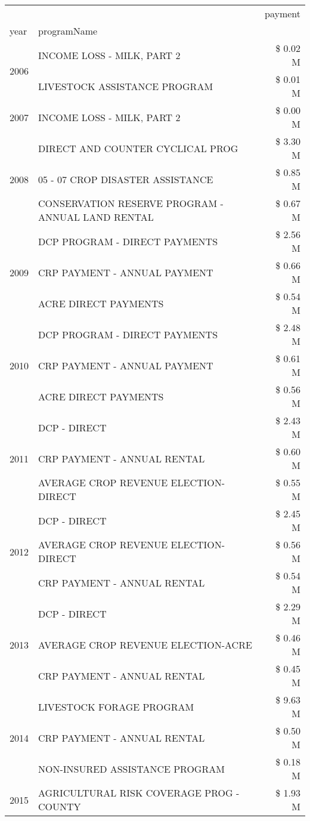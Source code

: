 \begin{tabular}{llr}
\toprule
 &  & payment \\
year & programName &  \\
\midrule
\multirow[t]{2}{*}{2006} & INCOME LOSS - MILK, PART 2 & \$ 0.02 M \\
 & LIVESTOCK ASSISTANCE PROGRAM & \$ 0.01 M \\
\cline{1-3}
2007 & INCOME LOSS - MILK, PART 2 & \$ 0.00 M \\
\cline{1-3}
\multirow[t]{3}{*}{2008} & DIRECT AND COUNTER CYCLICAL PROG & \$ 3.30 M \\
 & 05 - 07 CROP DISASTER ASSISTANCE & \$ 0.85 M \\
 & CONSERVATION RESERVE PROGRAM - ANNUAL LAND RENTAL & \$ 0.67 M \\
\cline{1-3}
\multirow[t]{3}{*}{2009} & DCP PROGRAM - DIRECT PAYMENTS & \$ 2.56 M \\
 & CRP PAYMENT - ANNUAL PAYMENT & \$ 0.66 M \\
 & ACRE DIRECT PAYMENTS & \$ 0.54 M \\
\cline{1-3}
\multirow[t]{3}{*}{2010} & DCP PROGRAM - DIRECT PAYMENTS & \$ 2.48 M \\
 & CRP PAYMENT - ANNUAL PAYMENT & \$ 0.61 M \\
 & ACRE DIRECT PAYMENTS & \$ 0.56 M \\
\cline{1-3}
\multirow[t]{3}{*}{2011} & DCP - DIRECT & \$ 2.43 M \\
 & CRP PAYMENT - ANNUAL RENTAL & \$ 0.60 M \\
 & AVERAGE CROP REVENUE ELECTION-DIRECT & \$ 0.55 M \\
\cline{1-3}
\multirow[t]{3}{*}{2012} & DCP - DIRECT & \$ 2.45 M \\
 & AVERAGE CROP REVENUE ELECTION-DIRECT & \$ 0.56 M \\
 & CRP PAYMENT - ANNUAL RENTAL & \$ 0.54 M \\
\cline{1-3}
\multirow[t]{3}{*}{2013} & DCP - DIRECT & \$ 2.29 M \\
 & AVERAGE CROP REVENUE ELECTION-ACRE & \$ 0.46 M \\
 & CRP PAYMENT - ANNUAL RENTAL & \$ 0.45 M \\
\cline{1-3}
\multirow[t]{3}{*}{2014} & LIVESTOCK FORAGE PROGRAM & \$ 9.63 M \\
 & CRP PAYMENT - ANNUAL RENTAL & \$ 0.50 M \\
 & NON-INSURED ASSISTANCE PROGRAM & \$ 0.18 M \\
\cline{1-3}
\multirow[t]{3}{*}{2015} & AGRICULTURAL RISK COVERAGE PROG - COUNTY & \$ 1.93 M \\

\end{tabular}
